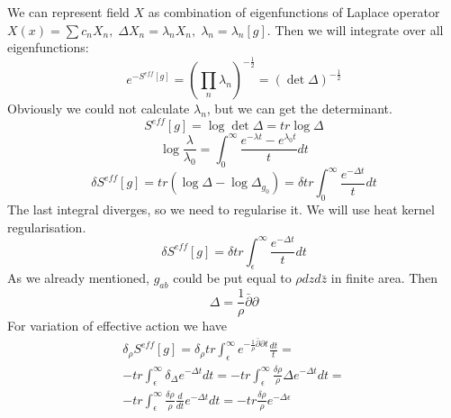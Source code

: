\documentclass[a4paper,12pt]{article}
\theoremstyle{definition} \newtheorem{Def}{Definition}
\begin{document}
We can represent field $X$ as combination of eigenfunctions of Laplace operator $X(x)=\sum c_n X_n,\; \Delta X_n = \lambda_n X_n,\; \lambda_n=\lambda_n[g]$. Then we will integrate over all eigenfunctions:
\begin{equation}
  \label{eq:36}
  e^{-S^{eff}[g]}=\left(\prod_{n} \lambda_n\right)^{-\frac{1}{2}}=(\det \Delta)^{-\frac{1}{2}}
\end{equation}
Obviously we could not calculate $\lambda_n$, but we can get the determinant.
\begin{equation}
  \label{eq:37}
  S^{eff}[g]=\log \det \Delta=tr \log \Delta
\end{equation}
\begin{equation}
  \label{eq:38}
  \log\frac{\lambda}{\lambda_0}=\int_0^{\infty}\frac{e^{-\lambda t}-e^{\lambda_0 t}}{t}dt
\end{equation}
\begin{equation}
  \label{eq:39}
  \delta S^{eff}[g]=tr (\log\Delta -\log\Delta_{g_0})=\delta tr \int_0^{\infty}\frac{e^{-\Delta t}}{t} dt
\end{equation}
The last integral diverges, so we need to regularise it. We will use heat kernel regularisation.
\begin{equation}
  \label{eq:40}
  \delta S^{eff}[g]=\delta tr \int_{\epsilon}^{\infty}\frac{e^{-\Delta t}}{t} dt  
\end{equation}
As we already mentioned, $\hat{g}_{ab}$ could be put equal to $\rho dz d\bar{z}$ in finite area. Then
\begin{equation}
  \label{eq:41}
  \Delta=\frac{1}{\rho}\bar{\partial}\partial
\end{equation}
For variation of effective action we have
  \begin{multline}
  \label{eq:42}
    \delta_{\rho}S^{eff}[g]=\delta_{\rho} tr \int_{\epsilon}^{\infty} e^{-\frac{1}{\rho}\bar{\partial}\partial t}\frac{dt}{t}=\\
    - tr \int_{\epsilon}^{\infty}\delta_{\Delta}e^{-\Delta t} dt=
    -tr \int_{\epsilon}^{\infty}\frac{\delta\rho}{\rho}\Delta e^{-\Delta t} dt=\\
    -tr \int_{\epsilon}^{\infty}\frac{\delta\rho}{\rho}\frac{d}{dt} e^{-\Delta t} dt=-tr \frac{\delta\rho}{\rho}e^{-\Delta \epsilon}
  \end{multline}
\end{document}
